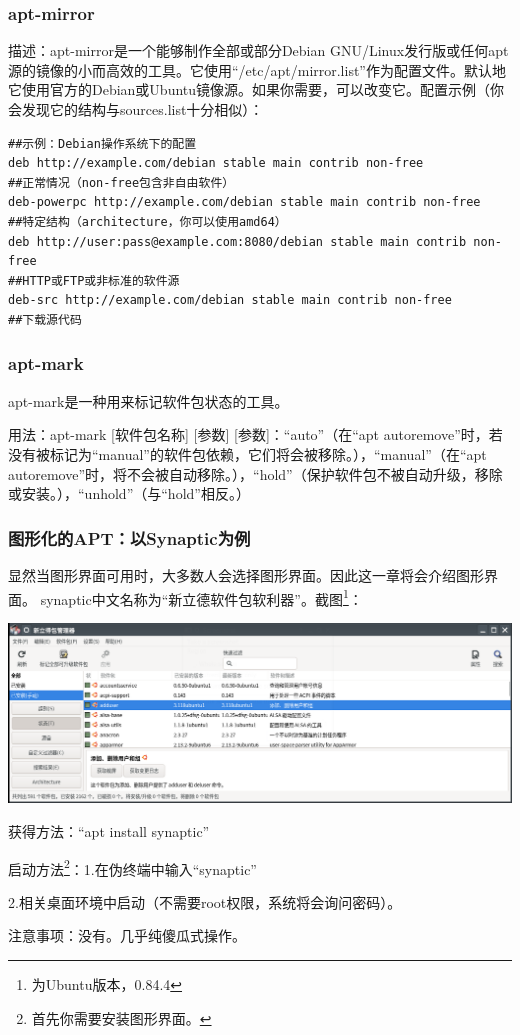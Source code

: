 \documentclass{book}
\begin{document}
\subsubsection{apt-mirror}
描述：apt-mirror是一个能够制作全部或部分Debian GNU/Linux发行版或任何apt源的镜像的小而高效的工具。它使用“/etc/apt/mirror.list”作为配置文件。默认地它使用官方的Debian或Ubuntu镜像源。如果你需要，可以改变它。配置示例（你会发现它的结构与sources.list十分相似）：
\begin{verbatim}
##示例：Debian操作系统下的配置
deb http://example.com/debian stable main contrib non-free
##正常情况（non-free包含非自由软件）
deb-powerpc http://example.com/debian stable main contrib non-free
##特定结构（architecture，你可以使用amd64）
deb http://user:pass@example.com:8080/debian stable main contrib non-free
##HTTP或FTP或非标准的软件源
deb-src http://example.com/debian stable main contrib non-free
##下载源代码
\end{verbatim}
\subsubsection{apt-mark}
\cite{manaptmark}\par
apt-mark是一种用来标记软件包状态的工具。\par
用法：apt-mark [软件包名称] [参数]
[参数]：“auto”（在“apt autoremove”时，若没有被标记为“manual”的软件包依赖，它们将会被移除。），“manual”（在“apt autoremove”时，将不会被自动移除。{\color{red}{这个命令可以防止“apt autoremove”对系统造成不可逆的致命破坏。}}），“hold”（保护软件包不被自动升级，移除或安装。），“unhold”（与“hold”相反。）
\subsubsection{图形化的APT：以Synaptic为例}
显然当图形界面可用时，大多数人会选择图形界面。因此这一章将会介绍图形界面。
synaptic中文名称为“新立德软件包软利器”。截图\footnote{为Ubuntu版本，0.84.4}：
\begin{center}
\includegraphics[scale=0.5]{pic/synaptic.png} 	
\end{center}
获得方法：“apt install synaptic” \par
启动方法\footnote{首先你需要安装图形界面。}：1.在伪终端中输入“synaptic”\par
2.相关桌面环境中启动（不需要root权限，系统将会询问密码）。\par
注意事项：没有。几乎纯傻瓜式操作。
\end{document}
